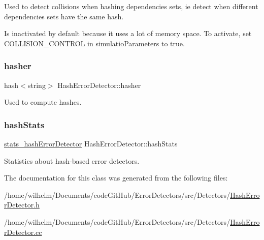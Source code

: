 Used to detect collisions when hashing dependencies sets, ie detect when different dependencies sets have the same hash. 

Is inactivated by default because it uses a lot of memory space. To activate, set C\+O\+L\+L\+I\+S\+I\+O\+N\+\_\+\+C\+O\+N\+T\+R\+OL in simulatio\+Parameters to true. \mbox{\label{class_hash_error_detector_a5193286d834f087e03b7299e81b60509}} 
\subsubsection{\texorpdfstring{hasher}{hasher}}
{\footnotesize\ttfamily hash$<$string$>$ Hash\+Error\+Detector\+::hasher\hspace{0.3cm}{\ttfamily [private]}}



Used to compute hashes. 

\mbox{\label{class_hash_error_detector_aec82c653679515b306b34eb075cf37fd}} 
\subsubsection{\texorpdfstring{hash\+Stats}{hashStats}}
{\footnotesize\ttfamily \hyperlink{_hash_error_detector_8h_afcf148bcfe372c25deda29220815b9e0}{stats\+\_\+hash\+Error\+Detector} Hash\+Error\+Detector\+::hash\+Stats\hspace{0.3cm}{\ttfamily [private]}}



Statistics about hash-\/based error detectors. 



The documentation for this class was generated from the following files\+:\begin{DoxyCompactItemize}
\item 
/home/wilhelm/\+Documents/code\+Git\+Hub/\+Error\+Detectors/src/\+Detectors/\hyperlink{_hash_error_detector_8h}{Hash\+Error\+Detector.\+h}\item 
/home/wilhelm/\+Documents/code\+Git\+Hub/\+Error\+Detectors/src/\+Detectors/\hyperlink{_hash_error_detector_8cc}{Hash\+Error\+Detector.\+cc}\end{DoxyCompactItemize}
